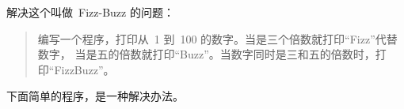 \begin{Exercise}[title={FizzBuzz},difficulty=0]
\label{ex:fizzbuzz}
\Question \label{ex:fizzbuzz q1} 解决这个叫做~Fizz-Buzz\cite{fizzbuzz} 的问题：
\begin{quote}
编写一个程序，打印从~1 到~100 的数字。当是三个倍数就打印``Fizz''代替数字，
当是五的倍数就打印``Buzz''。当数字同时是三和五的倍数时，打印``FizzBuzz''。
\end{quote}
\end{Exercise}

\begin{Answer}
\Question 下面简单的程序，是一种解决办法。

\showremarks
\end{Answer}
